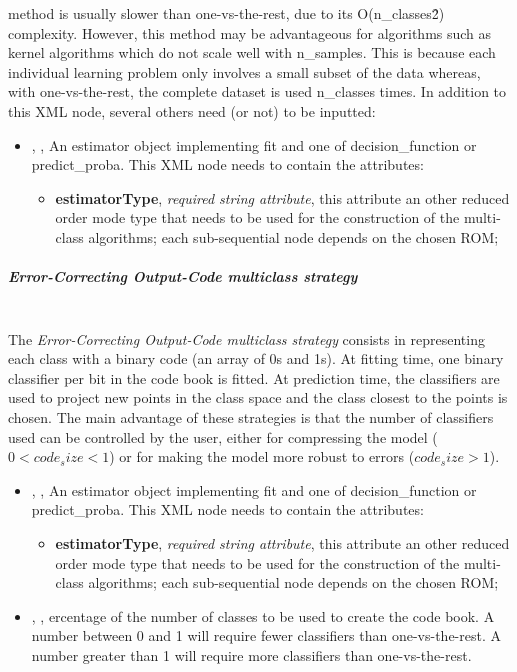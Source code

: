 method is usually slower than one-vs-the-rest, due to its O(n\_classes\^2)
complexity.
%
However, this method may be advantageous for algorithms such as kernel
algorithms which do not scale well with n\_samples.
%
This is because each individual learning problem only involves a small subset of
the data whereas, with one-vs-the-rest, the complete dataset is used n\_classes
times.
%
%
In addition to this XML node, several others need (or not) to be inputted:
\begin{itemize}
  \item {} , ,
  An estimator object implementing fit and one of decision\_function or
  predict\_proba.
  This XML node needs to contain the attributes:
  \vspace{-5mm}
  \begin{itemize}
    \itemsep0em
    \item \textbf{estimatorType}, \textit{required string attribute}, this
    attribute an other reduced order mode type that needs to be used for the
    construction of the multi-class algorithms; each sub-sequential node depends
    on the chosen ROM;
  \end{itemize}
\end{itemize}
\subparagraph{Error-Correcting Output-Code multiclass strategy}
\mbox{}
\\The \textit{Error-Correcting Output-Code multiclass strategy} consists in
representing each class with a binary code (an array of 0s and 1s).
%
At fitting time, one binary classifier per bit in the code book is fitted.
%
At prediction time, the classifiers are used to project new points in the class
space and the class closest to the points is chosen.
%
The main advantage of these strategies is that the number of classifiers used
can be controlled by the user, either for compressing the model ($0 < code_size
< 1$) or for making the model more robust to errors ($code_size > 1$).
%
\begin{itemize}
  \item {} , ,
  An estimator object implementing fit and one of decision\_function or
  predict\_proba.
  This XML node needs to contain the attributes:
  \vspace{-5mm}
\begin{itemize}
    \itemsep0em
    \item \textbf{estimatorType}, \textit{required string attribute}, this
    attribute an other reduced order mode type that needs to be used for the
    construction of the multi-class algorithms; each sub-sequential node depends
    on the chosen ROM;
\end{itemize}
  \item {} , ,
  ercentage of the number of classes to be used to create the code book.
  A number between 0 and 1 will require fewer classifiers than one-vs-the-rest.
  A number greater than 1 will require more classifiers than one-vs-the-rest.
\end{itemize}
